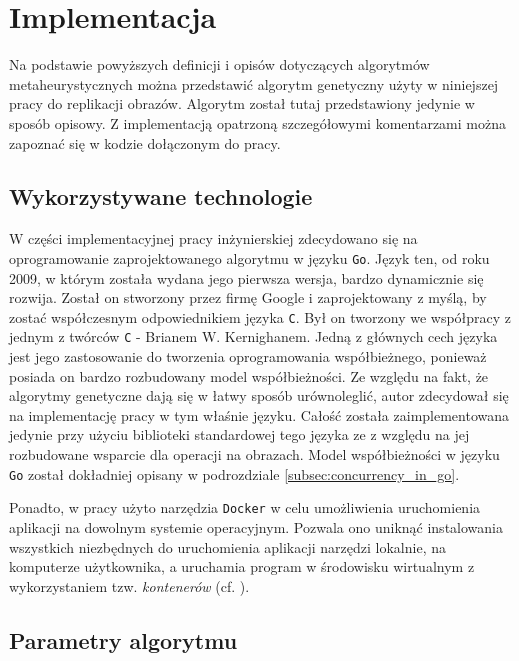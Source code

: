 \chapter{Implementacja}
\thispagestyle{chapterBeginStyle}
\label{rozdzial3}

Na podstawie powyższych definicji i opisów dotyczących algorytmów metaheurystycznych można przedstawić algorytm genetyczny użyty w niniejszej pracy do replikacji obrazów. Algorytm został tutaj przedstawiony jedynie w sposób opisowy. Z implementacją opatrzoną szczegółowymi komentarzami można zapoznać się w kodzie dołączonym do pracy.

\section{Wykorzystywane technologie}

W części implementacyjnej pracy inżynierskiej zdecydowano się na oprogramowanie zaprojektowanego algorytmu w języku \texttt{Go}. Język ten, od roku 2009, w którym została wydana jego pierwsza wersja, bardzo dynamicznie się rozwija. Został on stworzony przez firmę Google i zaprojektowany z myślą, by zostać współczesnym odpowiednikiem języka \texttt{C}. Był on tworzony we współpracy z jednym z twórców \texttt{C} - Brianem W. Kernighanem. Jedną z głównych cech języka jest jego zastosowanie do tworzenia oprogramowania współbieżnego, ponieważ posiada on bardzo rozbudowany model współbieżności. Ze względu na fakt, że algorytmy genetyczne dają się w łatwy sposób urównoleglić, autor zdecydował się na implementację pracy w tym właśnie języku. Całość została zaimplementowana jedynie przy użyciu biblioteki standardowej tego języka ze z względu na jej rozbudowane wsparcie dla operacji na obrazach. Model współbieżności w języku \texttt{Go} został dokładniej opisany w podrozdziale \ref{subsec:concurrency_in_go}.

Ponadto, w pracy użyto narzędzia \texttt{Docker} w celu umożliwienia uruchomienia aplikacji na dowolnym systemie operacyjnym. Pozwala ono uniknąć instalowania wszystkich niezbędnych do uruchomienia aplikacji narzędzi lokalnie, na komputerze użytkownika, a uruchamia program w środowisku wirtualnym z wykorzystaniem tzw. \textit{kontenerów} (cf. \cite{DockerOverview}).

\section{Parametry algorytmu}

